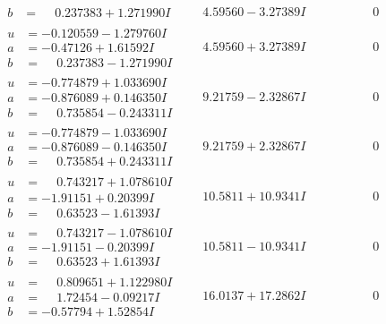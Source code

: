 \documentclass[1p]{elsarticle_modified}
\theoremstyle{definition}
\begin{document}
$$\begin{array}{c|c|c}
\begin{aligned}
b &= \phantom{-}0.237383 + 1.271990 I\end{aligned}
 & \phantom{-}4.59560 - 3.27389 I & \phantom{-0.000000 } 0 \\ \hline\begin{aligned}
u &= -0.120559 - 1.279760 I \\
a &= -0.47126 + 1.61592 I \\
b &= \phantom{-}0.237383 - 1.271990 I\end{aligned}
 & \phantom{-}4.59560 + 3.27389 I & \phantom{-0.000000 } 0 \\ \hline\begin{aligned}
u &= -0.774879 + 1.033690 I \\
a &= -0.876089 + 0.146350 I \\
b &= \phantom{-}0.735854 - 0.243311 I\end{aligned}
 & \phantom{-}9.21759 - 2.32867 I & \phantom{-0.000000 } 0 \\ \hline\begin{aligned}
u &= -0.774879 - 1.033690 I \\
a &= -0.876089 - 0.146350 I \\
b &= \phantom{-}0.735854 + 0.243311 I\end{aligned}
 & \phantom{-}9.21759 + 2.32867 I & \phantom{-0.000000 } 0 \\ \hline\begin{aligned}
u &= \phantom{-}0.743217 + 1.078610 I \\
a &= -1.91151 + 0.20399 I \\
b &= \phantom{-}0.63523 - 1.61393 I\end{aligned}
 & \phantom{-}10.5811 + 10.9341 I & \phantom{-0.000000 } 0 \\ \hline\begin{aligned}
u &= \phantom{-}0.743217 - 1.078610 I \\
a &= -1.91151 - 0.20399 I \\
b &= \phantom{-}0.63523 + 1.61393 I\end{aligned}
 & \phantom{-}10.5811 - 10.9341 I & \phantom{-0.000000 } 0 \\ \hline\begin{aligned}
u &= \phantom{-}0.809651 + 1.122980 I \\
a &= \phantom{-}1.72454 - 0.09217 I \\
b &= -0.57794 + 1.52854 I\end{aligned}
 & \phantom{-}16.0137 + 17.2862 I & \phantom{-0.000000 } 0 \\ \hline\begin{aligned}

\end{aligned}
\end{array}$$
\end{document}
